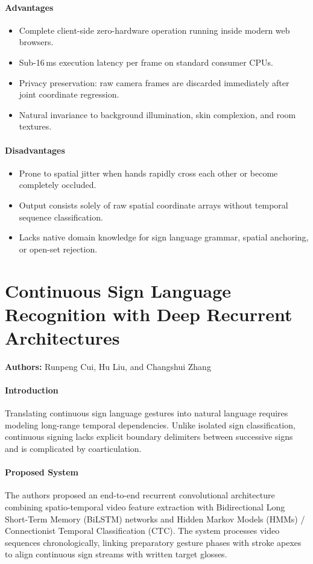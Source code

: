 \paragraph{Advantages}
\begin{itemize}
    \item Complete client-side zero-hardware operation running inside modern web browsers.
    \item Sub-16\,ms execution latency per frame on standard consumer CPUs.
    \item Privacy preservation: raw camera frames are discarded immediately after joint coordinate regression.
    \item Natural invariance to background illumination, skin complexion, and room textures.
\end{itemize}

\paragraph{Disadvantages}
\begin{itemize}
    \item Prone to spatial jitter when hands rapidly cross each other or become completely occluded.
    \item Output consists solely of raw spatial coordinate arrays without temporal sequence classification.
    \item Lacks native domain knowledge for sign language grammar, spatial anchoring, or open-set rejection.
\end{itemize}

\section{Continuous Sign Language Recognition with Deep Recurrent Architectures}
\textbf{Authors:} Runpeng Cui, Hu Liu, and Changshui Zhang \cite{7,9}

\paragraph{Introduction}
Translating continuous sign language gestures into natural language requires modeling long-range temporal dependencies. Unlike isolated sign classification, continuous signing lacks explicit boundary delimiters between successive signs and is complicated by coarticulation.

\paragraph{Proposed System}
The authors proposed an end-to-end recurrent convolutional architecture combining spatio-temporal video feature extraction with Bidirectional Long Short-Term Memory (BiLSTM) networks and Hidden Markov Models (HMMs) / Connectionist Temporal Classification (CTC). The system processes video sequences chronologically, linking preparatory gesture phases with stroke apexes to align continuous sign streams with written target glosses.

